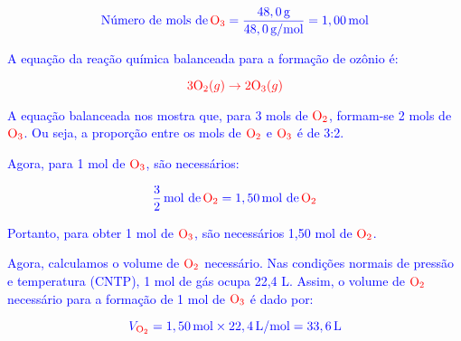 \documentclass[a4paper, 12pt]{article}
\begin{document}
\begin{enumerate}
          \[
              \textcolor{blue}{\text{Número de mols de} \, \textcolor{red}{\text{O}_3} = \frac{48,0 \, \text{g}}{48,0 \, \text{g/mol}} = 1,00 \, \text{mol}}
          \]

          \textcolor{blue}{A equação da reação química balanceada para a formação de ozônio é:}

          \[
              \textcolor{blue}{\textcolor{red}{3\text{O}_2(g) \rightarrow 2\text{O}_3(g)}}
          \]

          \textcolor{blue}{A equação balanceada nos mostra que, para 3 mols de $\textcolor{red}{\text{O}_2}$, formam-se 2 mols de $\textcolor{red}{\text{O}_3}$. Ou seja, a proporção entre os mols de $\textcolor{red}{\text{O}_2}$ e $\textcolor{red}{\text{O}_3}$ é de 3:2.}

          \textcolor{blue}{Agora, para 1 mol de $\textcolor{red}{\text{O}_3}$, são necessários:}

          \[
              \textcolor{blue}{\frac{3}{2} \, \text{mol de} \, \textcolor{red}{\text{O}_2} = 1,50 \, \text{mol de} \, \textcolor{red}{\text{O}_2}}
          \]

          \textcolor{blue}{Portanto, para obter 1 mol de $\textcolor{red}{\text{O}_3}$, são necessários 1,50 mol de $\textcolor{red}{\text{O}_2}$.}

          \textcolor{blue}{Agora, calculamos o volume de $\textcolor{red}{\text{O}_2}$ necessário. Nas condições normais de pressão e temperatura (CNTP), 1 mol de gás ocupa 22,4 L. Assim, o volume de $\textcolor{red}{\text{O}_2}$ necessário para a formação de 1 mol de $\textcolor{red}{\text{O}_3}$ é dado por:}

          \[
              \textcolor{blue}{V_{\textcolor{red}{\text{O}_2}} = 1,50 \, \text{mol} \times 22,4 \, \text{L/mol} = 33,6 \, \text{L}}
          \]



\end{enumerate}
\end{document}

